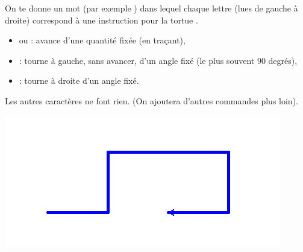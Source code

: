 \documentclass[12pt,class=report,crop=false]{standalone}
\begin{document}
\newpage

On te donne un mot (par exemple ) dans lequel chaque lettre (lues de gauche à droite) correspond à une instruction pour la tortue \Python{}.

\begin{itemize}
  \item {} ou  : avance d'une quantité fixée (en traçant),
  \item {} : tourne à gauche, sans avancer, d'un angle fixé (le plus souvent $90$ degrés),
  \item {} : tourne à droite d'un angle fixé.
\end{itemize}

Les autres caractères ne font rien. (On ajoutera d'autres commandes plus loin).


\begin{center}
\includegraphics[scale=0.6]{ecran-lsysteme-1}
\end{center}
\end{document}
